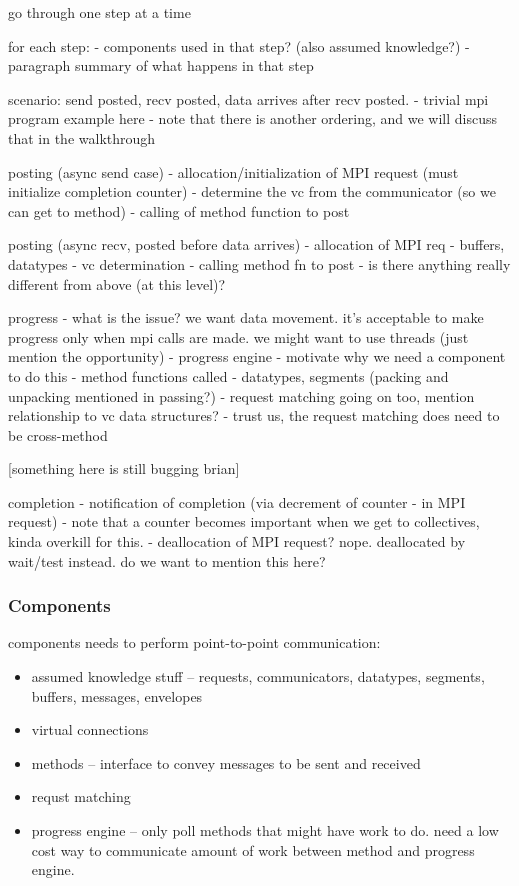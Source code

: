 go through one step at a time

for each step:
- components used in that step? (also assumed knowledge?)
- paragraph summary of what happens in that step

scenario: send posted, recv posted, data arrives after recv posted.
- trivial mpi program example here
- note that there is another ordering, and we will discuss that in the
  walkthrough

posting (async send case)
- allocation/initialization of MPI request (must initialize completion counter)
- determine the vc from the communicator (so we can get to method)
- calling of method function to post

posting (async recv, posted before data arrives)
- allocation of MPI req
- buffers, datatypes
- vc determination
- calling method fn to post
- is there anything really different from above (at this level)?

progress 
- what is the issue?  we want data movement.  it's acceptable to make progress
  only when mpi calls are made.  we might want to use threads (just mention 
  the opportunity)
- progress engine - motivate why we need a component to do this
- method functions called
- datatypes, segments (packing and unpacking mentioned in passing?)
- request matching going on too, mention relationship to vc data structures?
- trust us, the request matching does need to be cross-method

[something here is still bugging brian]


completion
- notification of completion (via decrement of counter - in MPI request)
- note that a counter becomes important when we get to collectives, kinda
  overkill for this.
- deallocation of MPI request?  nope.  deallocated by wait/test instead.  
  do we want to mention this here?



\subsubsection{Components}

components needs to perform point-to-point communication:
\begin{itemize}
\item assumed knowledge stuff -- requests, communicators, datatypes, segments, buffers, messages, envelopes
\item virtual connections
\item methods --
interface to convey messages to be sent and received
\item requst matching
\item progress engine --
only poll methods that might have work to do.  need a low cost way to
communicate amount of work between method and progress engine.
\end{itemize}

